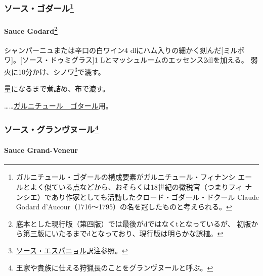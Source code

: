\begin{recette}
\maeaki

\hypertarget{ux30bdux30fcux30b9ux30b4ux30c0ux30fcux30eb37}{%
\subsubsection[ソース・ゴダール]{\texorpdfstring{ソース・ゴダール\footnote{ガルニチュール・ゴダールの構成要素がガルニチュール・フィナンシ
  エールとよく似ている点などから、おそらくは18世紀の徴税官（つまりフィ
  ナンシエ）であり作家としても活動したクロード・ゴダール・ドクール
  Claude Godard d'Aucour（1716〜1795）の名を冠したものと考えられる。}}{ソース・ゴダール}}\label{ux30bdux30fcux30b9ux30b4ux30c0ux30fcux30eb37}}

\hypertarget{sauce-godard}{%
\paragraph[Sauce Godard]{\texorpdfstring{Sauce Godard\footnote{底本とした現行版（第四版）では最後がdではなくtとなっているが、
  初版から第三版にいたるまでdとなっており、現行版は明らかな誤植。}}{Sauce Godard}}\label{sauce-godard}}

  

シャンパーニュまたは辛口の白ワイン4 dlにハム入りの細かく刻んだ{[}ミルポ
ワ{]}。{[}ソース・ドゥミグラス{]}1
Lとマッシュルームのエッセンス2dlを加える。
弱火に10分かけ、シノワ\footnote{\protect\hyperlink{sauce-espagnole}{ソース・エスパニョル}訳注参照。}で漉す。

\deuxtiers{}量になるまで煮詰め、布で漉す。

\ldots{}\ldots{}\protect\hyperlink{}{ガルニチュール　ゴタール}用。

\maeaki

\hypertarget{ux30bdux30fcux30b9ux30b0ux30e9ux30f3ux30f4ux30ccux30fcux30eb40}{%
\subsubsection[ソース・グランヴヌール]{\texorpdfstring{ソース・グランヴヌール\footnote{王家や貴族に仕える狩猟長のことをグランヴヌールと呼ぶ。}}{ソース・グランヴヌール}}\label{ux30bdux30fcux30b9ux30b0ux30e9ux30f3ux30f4ux30ccux30fcux30eb40}}

\hypertarget{sauce-grand-veneur}{%
\paragraph{Sauce Grand-Veneur}\label{sauce-grand-veneur}}


\end{recette}
